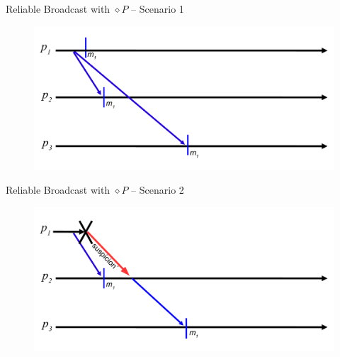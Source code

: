 \begin{frame}{Reliable Broadcast with $\diamond P$ -- Scenario 1}
	
\begin{figure}
\includegraphics[width=\textwidth]{figs/07/rb-diamond1}
\end{figure}
	
\end{frame}

\begin{frame}{Reliable Broadcast with $\diamond P$ -- Scenario 2}
	
\begin{figure}
\includegraphics[width=\textwidth]{figs/07/rb-diamond2}
\end{figure}

\end{frame}
	
